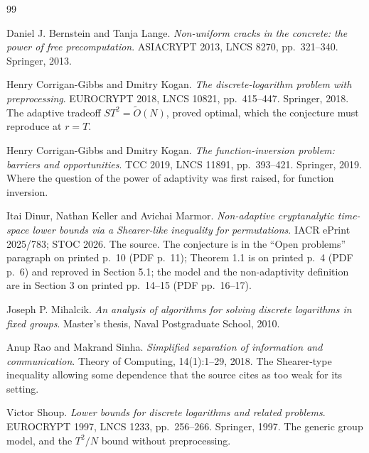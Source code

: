 \documentclass{aicr-conjecture}
\newcommand{\Ot}{\widetilde{O}}
\begin{document}
\begin{aicrbibliography}{99}

Daniel J. Bernstein and Tanja Lange.
\emph{Non-uniform cracks in the concrete: the power of free
precomputation}.
ASIACRYPT 2013, LNCS 8270, pp.\ 321--340. Springer, 2013.

Henry Corrigan-Gibbs and Dmitry Kogan.
\emph{The discrete-logarithm problem with preprocessing}.
EUROCRYPT 2018, LNCS 10821, pp.\ 415--447. Springer, 2018.
The adaptive tradeoff $ST^{2} = \Ot(N)$, proved optimal, which the
conjecture must reproduce at $r = T$.

Henry Corrigan-Gibbs and Dmitry Kogan.
\emph{The function-inversion problem: barriers and opportunities}.
TCC 2019, LNCS 11891, pp.\ 393--421. Springer, 2019.
Where the question of the power of adaptivity was first raised, for
function inversion.

Itai Dinur, Nathan Keller and Avichai Marmor.
\emph{Non-adaptive cryptanalytic time-space lower bounds via a
Shearer-like inequality for permutations}.
IACR ePrint 2025/783; STOC 2026.
The source. The conjecture is in the ``Open problems'' paragraph on
printed p.\ 10 (PDF p.\ 11); Theorem 1.1 is on printed p.\ 4 (PDF
p.\ 6) and reproved in Section 5.1; the model and the non-adaptivity
definition are in Section 3 on printed pp.\ 14--15 (PDF pp.\ 16--17).

Joseph P. Mihalcik.
\emph{An analysis of algorithms for solving discrete logarithms in
fixed groups}.
Master's thesis, Naval Postgraduate School, 2010.

Anup Rao and Makrand Sinha.
\emph{Simplified separation of information and communication}.
Theory of Computing, 14(1):1--29, 2018.
The Shearer-type inequality allowing some dependence that the source
cites as too weak for its setting.

Victor Shoup.
\emph{Lower bounds for discrete logarithms and related problems}.
EUROCRYPT 1997, LNCS 1233, pp.\ 256--266. Springer, 1997.
The generic group model, and the $T^{2}/N$ bound without preprocessing.

\end{aicrbibliography}
\end{document}
